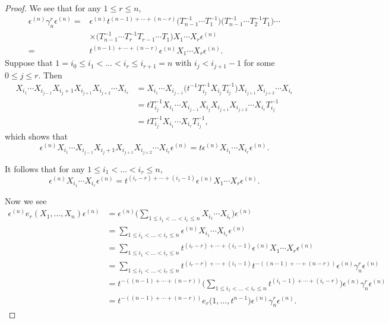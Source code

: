 \documentclass[pdftex]{sigma}
\numberwithin{equation}{section}
\theoremstyle{definition}
\begin{document}
\begin{proof}
 We see that for any $1\leq r \leq n$,
 \begin{align*}
 \epsilon^{(n)} \gamma_n^{r} \epsilon^{(n)}
 ={}& \epsilon^{(n)}t^{(n-1)+\cdots + (n-r)} \bigl(T_{n-1}^{-1}\cdots T_1^{-1}\bigr)\bigl(T_{n-1}^{-1}\cdots T_2^{-1}T_1\bigr)\cdots\\
 & \times \bigl(T_{n-1}^{-1}\cdots T_r^{-1}T_{r-1}\cdots T_1\bigr) X_1\cdots X_r \epsilon^{(n)} \\
 ={}& t^{(n-1)+\cdots + (n-r)} \epsilon^{(n)} X_1\cdots X_r \epsilon^{(n)}.
 \end{align*}
Suppose that $1 = i_0 \leq i_1 < \dots < i_r \leq i_{r+1} = n $ with $i_j < i_{j+1}-1$ for some $0 \leq j \leq r$. Then
\begin{align*}
 X_{i_1}\cdots X_{i_{j-1}}X_{i_j +1}X_{i_{j+1}}X_{i_{j+2}}\cdots X_{i_r}
 &= X_{i_1}\cdots X_{i_{j-1}} \bigl(t^{-1}T_{i_j}^{-1}X_{i_j}T_{i_j}^{-1}\bigr)X_{i_{j+1}}X_{i_{j+2}}\cdots X_{i_r} \\
 &= tT_{i_j}^{-1} X_{i_1}\cdots X_{i_{j-1}} X_{i_j} X_{i_{j+1}}X_{i_{j+2}}\cdots X_{i_r}T_{i_j}^{-1} \\
 &= tT_{i_j}^{-1}X_{i_1}\cdots X_{i_r} T_{i_j}^{-1} ,
\end{align*}
which shows that
\[
\epsilon^{(n)}X_{i_1}\cdots X_{i_{j-1}}X_{i_j +1}X_{i_{j+1}}X_{i_{j+2}}\cdots X_{i_r} \epsilon^{(n)} = t\epsilon^{(n)}X_{i_1}\cdots X_{i_r}\epsilon^{(n)}.
\]


It follows that for any $1\leq i_1 < \dots < i_r \leq n$,
\[
\epsilon^{(n)}X_{i_1}\cdots X_{i_r}\epsilon^{(n)} = t^{ (i_r -r)+\cdots + (i_1 -1)}\epsilon^{(n)} X_1\cdots X_r\epsilon^{(n)}.
\]


Now we see
\begin{align*}
 \epsilon^{(n)} e_r(X_1,\dots, X_n) \epsilon^{(n)}
 &= \epsilon^{(n)} \biggl(\sum_{1\leq i_1< \dots < i_r \leq n} X_{i_1}\cdots X_{i_r} \biggr) \epsilon^{(n)} \\
 & = \sum_{1\leq i_1< \dots < i_r \leq n} \epsilon^{(n)} X_{i_1}\cdots X_{i_r} \epsilon^{(n)} \\
 & = \sum_{1\leq i_1< \dots < i_r \leq n} t^{ (i_r -r)+\cdots + (i_1 -1)}\epsilon^{(n)} X_1\cdots X_r\epsilon^{(n)} \\
 &= \sum_{1\leq i_1< \dots < i_r \leq n} t^{ (i_r -r)+\cdots + (i_1 -1)} t^{-( (n-1)+\cdots + (n-r))}\epsilon^{(n)} \gamma_n^{r} \epsilon^{(n)} \\
 &= t^{-( (n-1)+\cdots + (n-r))}\biggl(\sum_{1\leq i_1< \dots < i_r \leq n} t^{ (i_1 -1)+\cdots + (i_r -r)}\biggr) \epsilon^{(n)} \gamma_n^{r} \epsilon^{(n)} \\
 & = t^{-( (n-1)+\cdots + (n-r))} e_r\bigl(1,\dots, t^{n-1}\bigr) \epsilon^{(n)} \gamma_n^{r} \epsilon^{(n)}. \tag*{\qed}
\end{align*} \renewcommand{\qed}{}
\end{proof}
\end{document}
